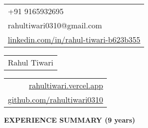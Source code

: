 \documentclass[a4paper,11pt]{article}
\newcommand{\lsep}{-0.5cm}
\newcommand{\resheading}[1]{{\small \colorbox{mygrey}{\begin{minipage}{0.975\textwidth}{\textbf{#1 \vphantom{p\^{E}}}}\end{minipage}}}}
\begin{document}
{\normalsize\begin{tabular}[c]{l}
\\
  +91 9165932695 \\
  rahultiwari0310@gmail.com \\
  \href{https://www.linkedin.com/in/rahul-tiwari-b623b355/}{linkedin.com/in/rahul-tiwari-b623b355} \\
\end{tabular}}\hfill%
{\Large\bfseries\begin{tabular}[c]{c}
  Rahul Tiwari
\end{tabular}}\hfill%
{\normalsize\begin{tabular}[c]{r}
\\
  \href{https://rahultiwari.vercel.app/}{rahultiwari.vercel.app} \\
  \href{https://github.com/rahultiwari0310}{github.com/rahultiwari0310} \\
\end{tabular}}%

\bigskip

\resheading{\textbf{\large EXPERIENCE SUMMARY (9 years)} }\\[\lsep]
\end{document}
